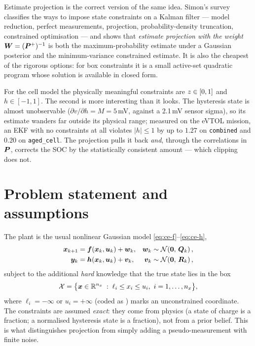 Estimate projection is the correct version of the same idea.  Simon's survey
\cite{simon2010constraints} classifies the ways to impose state constraints on a Kalman filter ---
model reduction, perfect measurements, projection, probability-density truncation, constrained
optimisation --- and shows that \emph{estimate projection with the weight $\bm{W}=(\bm{P}^{+})^{-1}$}
is both the maximum-probability estimate under a Gaussian posterior and the minimum-variance
constrained estimate.  It is also the cheapest of the rigorous options: for box constraints it is
a small active-set quadratic program whose solution is available in closed form.

For the cell model the physically meaningful constraints are $z\in[0,1]$ and $h\in[-1,1]$.  The
second is more interesting than it looks.  The hysteresis state is almost unobservable
($\partial v/\partial h = M = 5$\,mV, against a 2.1\,mV sensor sigma), so its estimate wanders far
outside its physical range; measured on the eVTOL mission, an EKF with no constraints at all
violates $|h|\le1$ by up to $1.27$ on \texttt{combined} and $0.20$ on \texttt{aged\_cell}.  The
projection pulls it back \emph{and}, through the correlations in $\bm{P}$, corrects the SOC by the
statistically consistent amount --- which clipping does not.

\section{Problem statement and assumptions}
The plant is the usual nonlinear Gaussian model \eqref{eq:ce-f}--\eqref{eq:ce-h},
\begin{align}
\bm{x}_{k+1}&=\bm{f}(\bm{x}_k,\bm{u}_k)+\bm{w}_k, & \bm{w}_k&\sim\mathcal{N}\!\left(\bm 0,\,\bm{Q}_k\right), \label{eq:ce-f}\\
\bm{y}_k&=\bm{h}(\bm{x}_k,\bm{u}_k)+\bm{v}_k, & \bm{v}_k&\sim\mathcal{N}\!\left(\bm 0,\,\bm{R}_k\right), \label{eq:ce-h}
\end{align}
subject to the additional \emph{hard} knowledge that the true state lies in the box
\begin{equation}
\mathcal{X}=\big\{\bm{x}\in\mathbb{R}^{n_x}\;:\;\ell_i\le x_i\le u_i,\ i=1,\dots,n_x\big\},
\label{eq:ce-box}
\end{equation}
where $\ell_i=-\infty$ or $u_i=+\infty$ (coded as ) marks an unconstrained coordinate.
The constraints are assumed \emph{exact}: they come from physics (a state of charge is a fraction;
a normalised hysteresis state is a fraction), not from a prior belief.  This is what distinguishes
projection from simply adding a pseudo-measurement with finite noise.

